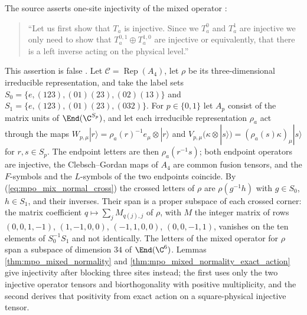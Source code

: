 The source asserts one-site injectivity of the mixed operator
\cite[Section~5]{GarreRubio2023MPOSym}:
\begin{quote}
    ``Let us first show that $T_a$ is injective. Since we $T_a^0$ and
    $T_a^1$ are injective we only need to show that
    $T_a^{0,1} \oplus T_a^{1,0}$ are injective or equivalently, that there
    is a left inverse acting on the physical level.''
\end{quote}
This assertion is false
\cite{gap:glm23_mixed_operator_one_site_injectivity}. Let
$\mathcal C=\operatorname{Rep}(A_4)$, let $\rho$ be its
three-dimensional irreducible representation, and take the label sets
$S_0=\{e,(123),(01)(23),(02)(13)\}$ and
$S_1=\{e,(123),(01)(23),(032)\}$. For $p\in\{0,1\}$ let $A_p$ consist of
the matrix units of $\End(\C^{S_p})$, and let each irreducible
representation $\rho_a$ act through the maps
$W_{p,\mu}|r\rangle=\rho_a(r)^{-1}e_\mu\otimes|r\rangle$ and
$V_{p,\mu}(\kappa\otimes|s\rangle)=(\rho_a(s)\kappa)_\mu|s\rangle$ for
$r,s\in S_p$. The endpoint letters are then $\rho_a(r^{-1}s)$; both
endpoint operators are injective, the Clebsch--Gordan maps of $A_4$ are
common fusion tensors, and the $F$-symbols and the $L$-symbols of the two
endpoints coincide. By (\ref{eq:mpo_mix_normal_cross}) the crossed
letters of $\rho$ are $\rho(g^{-1}h)$ with $g\in S_0$, $h\in S_1$, and
their inverses. Their span is a proper subspace of each crossed corner:
the matrix coefficient $q\mapsto\sum_jM_{q(j),j}$ of $\rho$, with $M$ the
integer matrix of rows $(0,0,1,-1)$, $(1,-1,0,0)$, $(-1,1,0,0)$,
$(0,0,-1,1)$, vanishes on the ten elements of $S_0^{-1}S_1$ and not
identically. The letters of the mixed operator for $\rho$ span a subspace
of dimension $34$ of $\End(\C^6)$. Lemmas \ref{thm:mpo_mixed_normality}
and \ref{thm:mpo_mixed_normality_exact_action} give injectivity after
blocking three sites instead; the first uses only the two injective
operator tensors and biorthogonality with positive multiplicity, and the
second derives that positivity from exact action on a square-physical
injective tensor.
